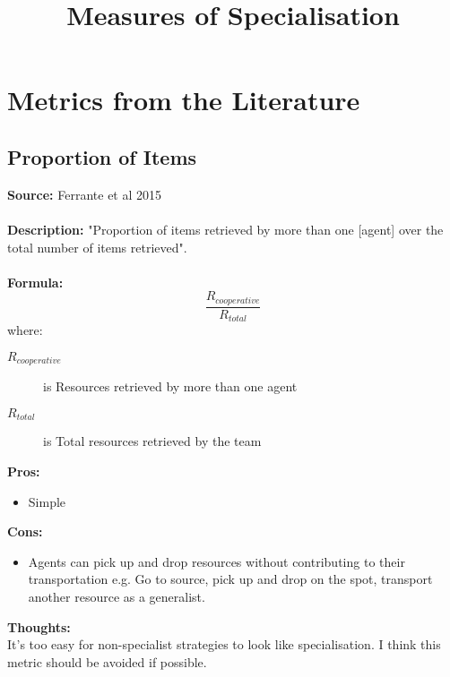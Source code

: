 \documentclass[12pt]{article}
\title{Measures of Specialisation}
\begin{document}
\maketitle

\section{Metrics from the Literature}

\subsection{Proportion of Items}
\textbf{Source: }Ferrante et al 2015 \cite{ferrante:PLoSCB:2015} \\\\
\textbf{Description: } "Proportion of items retrieved by more than one [agent] over the total number of items retrieved".\\\\
\textbf{Formula: }\\
%
\[
\frac{R_{cooperative}}{R_{total}}
\]
where:
\begin{description}
\item[$R_{cooperative}$] is Resources retrieved by more than one agent
\item[$R_{total}$] is Total resources retrieved by the team
\end{description}
%
\textbf{Pros:}
\begin{itemize}
\item Simple
\end{itemize}
\textbf{Cons:}
\begin{itemize}
\item Agents can pick up and drop resources without contributing to their transportation e.g. Go to source, pick up and drop on the spot, transport another resource as a generalist.
\end{itemize}
\textbf{Thoughts:}\\
It's too easy for non-specialist strategies to look like specialisation.
I think this metric should be avoided if possible.
\end{document}
